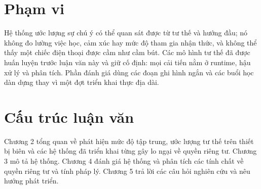 \section{Phạm vi}

Hệ thống ước lượng sự chú ý có thể quan sát được từ tư thế và hướng đầu; nó không đo lường việc học, cảm xúc hay mức độ tham gia nhận thức, và không thể thấy một chiếc điện thoại được cầm như cầm bút. Các mô hình tư thế đã được huấn luyện trước luận văn này và giữ cố định: mọi cải tiến nằm ở runtime, hậu xử lý và phân tích. Phần đánh giá dùng các đoạn ghi hình ngắn và các buổi học dàn dựng thay vì một đợt triển khai thực địa dài.

\section{Cấu trúc luận văn}

Chương 2 tổng quan về phát hiện mức độ tập trung, ước lượng tư thế trên thiết bị biên và các hệ thống đã triển khai từng gây lo ngại về quyền riêng tư. Chương 3 mô tả hệ thống. Chương 4 đánh giá hệ thống và phân tích các tính chất về quyền riêng tư và tính pháp lý. Chương 5 trả lời các câu hỏi nghiên cứu và nêu hướng phát triển.
